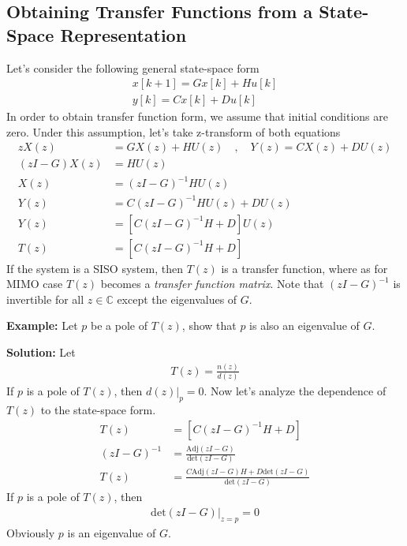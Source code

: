 \documentclass[twoside]{article}
\begin{document}
\subsection*{Obtaining Transfer Functions from a State-Space
  Representation}

Let's consider the following general state-space form
%
\begin{align*}
  x[k+1] = G x[k] + H u[k]
\\
  y[k] = C x[k] + D u[k]
\end{align*}
%
In order to obtain transfer function form,
we assume that initial conditions are zero.
Under this assumption, let's take z-transform
of both equations
%
\begin{align*}
  z X(z) &= G X(z) + H U(z) 
\quad , \quad
  Y(z) = C X(z) + D U(z)
\\
\left(z I - G \right) X(z) &= H U(z) 
\\
X(z) &= \left(z I - G \right)^{-1} H U(z)
\\
Y(z) &= C \left(z I - G \right)^{-1} H U(z) + D U(z) 
\\
Y(z) &= \left[ C \left(z I - G \right)^{-1} H + D \right] U(z)
\\
T(z) & = \left[ C \left(z I - G \right)^{-1} H + D \right]
\end{align*}
%
If the system is a SISO system, then $T(z)$ is a transfer function,
where as for MIMO case $T(z)$ becomes a \textit{transfer function
  matrix}. Note that $\left(z I - G \right)^{-1}$ is invertible for
all $z \in \mathbb{C}$ except the eigenvalues of $G$. 

\vspace{24pt}

\textbf{Example:} Let $p$ be a pole of $T(z)$, show that
$p$ is also an eigenvalue of $G$. 

\textbf{Solution:} Let 
%
\begin{align*}
  T(z) = \frac{n(z)}{d(z)}
\end{align*}
%
If $p$ is a pole of $T(z)$, then $d(z)|_{p} = 0$. Now let's analyze
the dependence of $T(z)$ to the state-space form. 
%
\begin{align*}
  T(z) &= \left[ C \left(z I - G \right)^{-1} H + D \right]
\\
  \left(z I - G \right)^{-1} &= 
\frac{\mathrm{Adj} \left(z I - G \right) }{\mathrm{det} \left(z I - G
                               \right) }
\\
 T(z) &= \frac{C \mathrm{Adj} \left(z I - G \right) H + D \mathrm{det}
        \left(z I - G
                               \right)}{\mathrm{det} \left(z I - G
                               \right) }
\end{align*}
%
If $p$ is a pole of $T(z)$, then 
%
\begin{align*}
\mathrm{det} \left(z I - G \right)|_{z = p} = 0
\end{align*}
%
Obviously $p$ is an eigenvalue of $G$.
\end{document}
